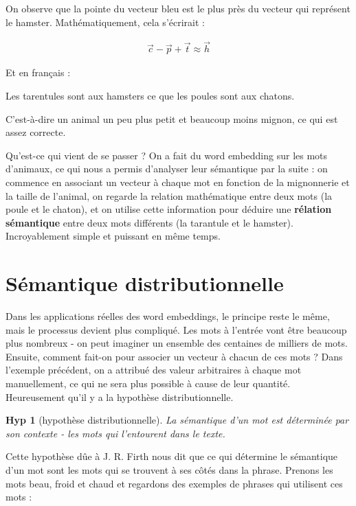 \documentclass[11pt, a4paper]{report}
\newtheorem{hyp}{Hyp}[section]
\begin{document}
On observe que la pointe du vecteur bleu est le plus près du vecteur qui représent le hamster.
Mathématiquement, cela s'écrirait :

\begin{align*}
  \vec{c} - \vec{p} + \vec{t} \approx \vec{h} 
\end{align*}

Et en français : 

\begin{center}
  Les tarentules sont aux hamsters ce que les poules sont aux chatons. 
\end{center}

C'est-à-dire un animal un peu plus petit et beaucoup moins mignon, ce qui est assez 
correcte. 

Qu'est-ce qui vient de se passer ? On a fait du word embedding sur les 
mots d'animaux, ce qui nous a permis d'analyser leur sémantique par la suite : 
on commence en associant un vecteur à chaque mot en fonction de la mignonnerie et la 
taille de l'animal, on regarde la relation mathématique entre deux mots
(la poule et le chaton), et on utilise cette information pour déduire une \textbf{rélation sémantique} entre deux mots différents
(la tarantule et le hamster). Incroyablement simple et puissant en même temps.

\section*{Sémantique distributionnelle}
Dans les applications réelles des word embeddings, le principe reste le même, mais le processus devient plus 
compliqué. Les mots à l'entrée vont être beaucoup plus nombreux - on peut imaginer un ensemble 
des centaines de milliers de mots. Ensuite, comment fait-on pour associer un vecteur à chacun
de ces mots ? Dans l'exemple précédent, on a attribué des valeur arbitraires à chaque mot 
manuellement, ce qui ne sera plus possible à cause de leur quantité. Heureusement qu'il y a la 
hypothèse distributionnelle. 

\begin{hyp}[hypothèse distributionnelle]
  La sémantique d'un mot est déterminée par son contexte - les mots qui l'entourent dans 
  le texte. 
\end{hyp}

Cette hypothèse dûe à J. R. Firth nous dit que ce qui détermine le sémantique d'un mot 
sont les mots qui se trouvent à ses côtés dans la phrase. Prenons les mots 
beau, froid et chaud et regardons des exemples de 
phrases qui utilisent ces mots : 
\end{document}
